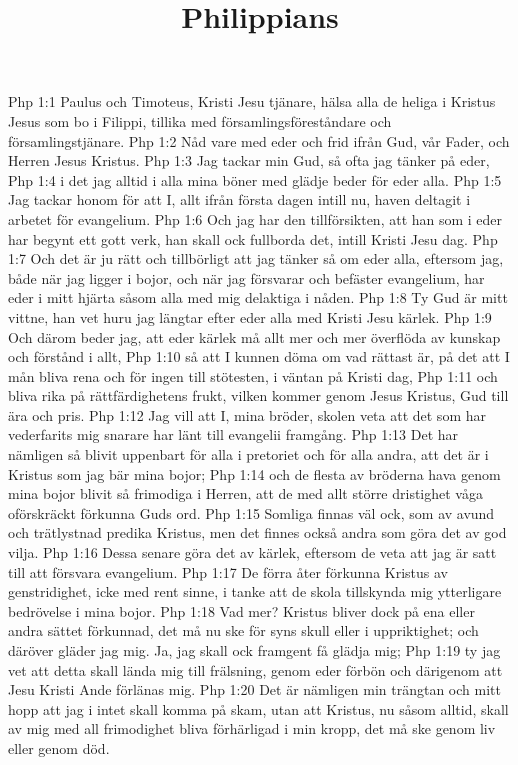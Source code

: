 

\title{Philippians}

Php 1:1  Paulus och Timoteus, Kristi Jesu tjänare, hälsa alla de heliga i Kristus Jesus som bo i Filippi, tillika med församlingsföreståndare och församlingstjänare.
Php 1:2  Nåd vare med eder och frid ifrån Gud, vår Fader, och Herren Jesus Kristus.
Php 1:3  Jag tackar min Gud, så ofta jag tänker på eder,
Php 1:4  i det jag alltid i alla mina böner med glädje beder för eder alla.
Php 1:5  Jag tackar honom för att I, allt ifrån första dagen intill nu, haven deltagit i arbetet för evangelium.
Php 1:6  Och jag har den tillförsikten, att han som i eder har begynt ett gott verk, han skall ock fullborda det, intill Kristi Jesu dag.
Php 1:7  Och det är ju rätt och tillbörligt att jag tänker så om eder alla, eftersom jag, både när jag ligger i bojor, och när jag försvarar och befäster evangelium, har eder i mitt hjärta såsom alla med mig delaktiga i nåden.
Php 1:8  Ty Gud är mitt vittne, han vet huru jag längtar efter eder alla med Kristi Jesu kärlek.
Php 1:9  Och därom beder jag, att eder kärlek må allt mer och mer överflöda av kunskap och förstånd i allt,
Php 1:10  så att I kunnen döma om vad rättast är, på det att I mån bliva rena och för ingen till stötesten, i väntan på Kristi dag,
Php 1:11  och bliva rika på rättfärdighetens frukt, vilken kommer genom Jesus Kristus, Gud till ära och pris.
Php 1:12  Jag vill att I, mina bröder, skolen veta att det som har vederfarits mig snarare har länt till evangelii framgång.
Php 1:13  Det har nämligen så blivit uppenbart för alla i pretoriet och för alla andra, att det är i Kristus som jag bär mina bojor;
Php 1:14  och de flesta av bröderna hava genom mina bojor blivit så frimodiga i Herren, att de med allt större dristighet våga oförskräckt förkunna Guds ord.
Php 1:15  Somliga finnas väl ock, som av avund och trätlystnad predika Kristus, men det finnes också andra som göra det av god vilja.
Php 1:16  Dessa senare göra det av kärlek, eftersom de veta att jag är satt till att försvara evangelium.
Php 1:17  De förra åter förkunna Kristus av genstridighet, icke med rent sinne, i tanke att de skola tillskynda mig ytterligare bedrövelse i mina bojor.
Php 1:18  Vad mer? Kristus bliver dock på ena eller andra sättet förkunnad, det må nu ske för syns skull eller i uppriktighet; och däröver gläder jag mig. Ja, jag skall ock framgent få glädja mig;
Php 1:19  ty jag vet att detta skall lända mig till frälsning, genom eder förbön och därigenom att Jesu Kristi Ande förlänas mig.
Php 1:20  Det är nämligen min trängtan och mitt hopp att jag i intet skall komma på skam, utan att Kristus, nu såsom alltid, skall av mig med all frimodighet bliva förhärligad i min kropp, det må ske genom liv eller genom död.
